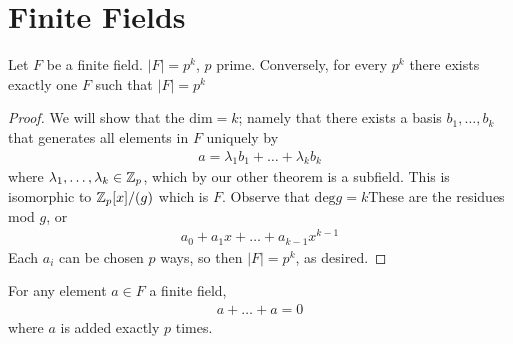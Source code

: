 \documentclass{memoir}
\begin{document}
\section{Finite Fields}
\label{sec:finite_fields}
\begin{thm}
	Let \(F\) be a finite field. \(\left| F \right| = p^{k}\), \(p\) prime. Conversely, for every \(p^{k}\) there exists exactly one \(F\) such that \(\left| F \right| = p^{k}\)
\end{thm}
\begin{proof}
We will show that the \( \textrm{dim} = k\); namely that there exists a basis \(b_1,\ldots,b_k\) that generates all elements in \(F\) uniquely by 
\begin{align*}
	a = \lambda_1 b_1 + \ldots + \lambda_k b_k
\end{align*}
where \(\lambda_1,\ldots,\lambda_k \in \mathbb{Z}_p\), which by our other theorem is a subfield. This is isomorphic to \(\mathbb{Z}_p[x] / (g)\) which is \(F\). Observe that \( \textrm{deg}g = k\)These are the residues mod \(g\), or
\begin{align*}
	a_0 + a_1x + \ldots + a_{k-1}x^{k-1}
\end{align*}
Each \(a_i\) can be chosen \(p\) ways, so then \(\left| F \right| = p^{k}\), as desired.
\end{proof}
\begin{thm}
	For any element \(a \in F\) a finite field,
	\begin{align*}
		a + \ldots + a = 0
	\end{align*}
	where \(a\) is added exactly \(p\) times.
\end{thm}
\end{document}
